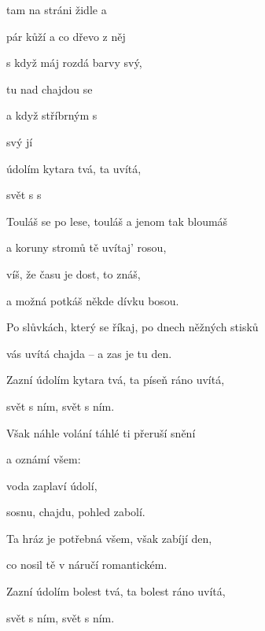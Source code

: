 

\zs
{} tam na stráni  židle a 

pár kůží a  co dřevo z něj  

s  když máj rozdá barvy svý,

tu  nad chajdou se 

a  když stříbrným  s 

svý  jí  

 údolím kytara tvá, ta  uvítá,

svět s  s 
\ks

\zs
Touláš se po lese, touláš a jenom tak bloumáš

a koruny stromů tě uvítaj' rosou,

víš, že času je dost, to znáš,

a možná potkáš někde dívku bosou.

Po slůvkách, který se říkaj, po dnech něžných stisků

vás uvítá chajda -- a zas je tu den.

Zazní údolím kytara tvá, ta píseň ráno uvítá,

svět s ním, svět s ním.
\ks

\zs
Však náhle volání táhlé ti přeruší snění

a oznámí všem: 

voda zaplaví údolí,

sosnu, chajdu, pohled zabolí.

Ta hráz je potřebná všem, však zabíjí den,

co nosil tě v náručí romantickém.

Zazní údolím bolest tvá, ta bolest ráno uvítá,

svět s ním, svět s ním.
\ks

\kp
